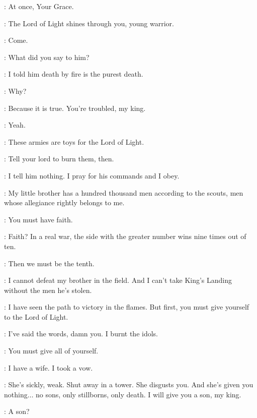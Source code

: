 \DAVOS: At once, Your Grace.


\MELISANDRE: The Lord of Light shines through you, young warrior.


\DAVOS: Come.

\STANNIS: What did you say to him?

\MELISANDRE: I told him death by fire is the purest death.

\STANNIS: Why?

\MELISANDRE: Because it is true. You're troubled, my king.

\STANNIS: Yeah.

\MELISANDRE: These armies are toys for the Lord of Light.

\STANNIS: Tell your lord to burn them, then.

\MELISANDRE: I tell him nothing. I pray for his commands and I obey.

\STANNIS: My little brother has a hundred thousand men according to the scouts, men whose allegiance rightly belongs to me.

\MELISANDRE: You must have faith.

\STANNIS: Faith? In a real war, the side with the greater number wins nine times out of ten.

\MELISANDRE: Then we must be the tenth.

\STANNIS: I cannot defeat my brother in the field. And I can't take King's Landing without the men he's stolen.

\MELISANDRE: I have seen the path to victory in the flames. But first, you must give yourself to the Lord of Light.

\STANNIS: I've said the words, damn you. I burnt the idols.

\MELISANDRE: You must give all of yourself.


\STANNIS: I have a wife. I took a vow.

\MELISANDRE: She's sickly, weak. Shut away in a tower. She disgusts you. And she's given you nothing$\ldots$ no sons, only stillborns, only death. I will give you a son, my king.

\STANNIS: A son?

